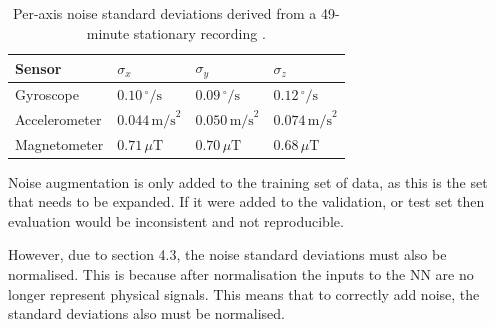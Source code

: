 \begin{table}[!htbp]
\centering
\small
\begin{tabular}{p{3cm} p{2.5cm} p{2.5cm} p{2.5cm}}
\hline
\textbf{Sensor} & \textbf{$\sigma_x$} & \textbf{$\sigma_y$} & \textbf{$\sigma_z$} \\
\hline
Gyroscope     & $0.10\,^{\circ}/\text{s}$  & $0.09\,^{\circ}/\text{s}$  & $0.12\,^{\circ}/\text{s}$  \\
Accelerometer & $0.044\,\text{m/s}^2$ & $0.050\,\text{m/s}^2$ & $0.074\,\text{m/s}^2$ \\
Magnetometer  & $0.71\,\mu\text{T}$   & $0.70\,\mu\text{T}$   & $0.68\,\mu\text{T}$   \\
\hline
\end{tabular}
\caption{Per-axis noise standard deviations derived from a 49-minute stationary recording \cite{laidig_2021_broada}.}
\label{tab:noise_augmentation}
\end{table}

Noise augmentation is only added to the training set of data, as this is the set that needs to be expanded. If it were added to the validation, or test set then
evaluation would be inconsistent and not reproducible. 

However, due to section 4.3, the noise standard deviations must also be normalised. This is because after normalisation the inputs to the NN are no longer 
represent physical signals. This means that to correctly add noise, the standard deviations also must be normalised. 

